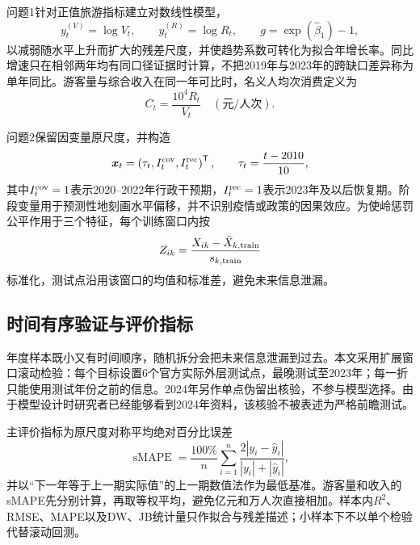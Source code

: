 \documentclass[withoutpreface,bwprint]{cumcmthesis}
\begin{document}
问题1针对正值旅游指标建立对数线性模型，
\begin{equation}
y_t^{(V)}=\log V_t,\qquad y_t^{(R)}=\log R_t,
\qquad g=\exp(\widehat{\beta}_1)-1,
\label{eq:q1_transform}
\end{equation}
以减弱随水平上升而扩大的残差尺度，并使趋势系数可转化为拟合年增长率。同比增速只在相邻两年均有同口径证据时计算，不把2019年与2023年的跨缺口差异称为单年同比。游客量与综合收入在同一年可比时，名义人均次消费定义为
\begin{equation}
C_t=\frac{10^4R_t}{V_t}\quad(\text{元/人次}).
\label{eq:per_capita}
\end{equation}

问题2保留因变量原尺度，并构造
\begin{equation}
\boldsymbol{x}_t=
\left(\tau_t,I_t^{\rm cov},I_t^{\rm rec}\right)^{\mathsf T},
\qquad
\tau_t=\frac{t-2010}{10},
\label{eq:ridge_features}
\end{equation}
其中$I_t^{\rm cov}=1$表示2020--2022年行政干预期，$I_t^{\rm rec}=1$表示2023年及以后恢复期。阶段变量用于预测性地刻画水平偏移，并不识别疫情或政策的因果效应。为使岭惩罚公平作用于三个特征，每个训练窗口内按
\begin{equation}
Z_{ik}=\frac{X_{ik}-\bar X_{k,\rm train}}{s_{k,\rm train}}
\label{eq:standardize}
\end{equation}
标准化，测试点沿用该窗口的均值和标准差，避免未来信息泄漏。

\subsection{时间有序验证与评价指标}

年度样本既小又有时间顺序，随机拆分会把未来信息泄漏到过去。本文采用扩展窗口滚动检验\cite{hyndman2021forecasting}：每个目标设置6个官方实际外层测试点，最晚测试至2023年；每一折只能使用测试年份之前的信息。2024年另作单点伪留出核验，不参与模型选择。由于模型设计时研究者已经能够看到2024年资料，该核验不被表述为严格前瞻测试。

主评价指标为原尺度对称平均绝对百分比误差
\begin{equation}
\operatorname{sMAPE}
=\frac{100\%}{n}\sum_{i=1}^{n}
\frac{2|y_i-\widehat y_i|}
{|y_i|+|\widehat y_i|},
\label{eq:smape}
\end{equation}
并以“下一年等于上一期实际值”的上一期数值法作为最低基准。游客量和收入的sMAPE先分别计算，再取等权平均，避免亿元和万人次直接相加。样本内$R^2$、RMSE、MAPE以及DW、JB统计量只作拟合与残差描述；小样本下不以单个检验代替滚动回测。


\end{document}
